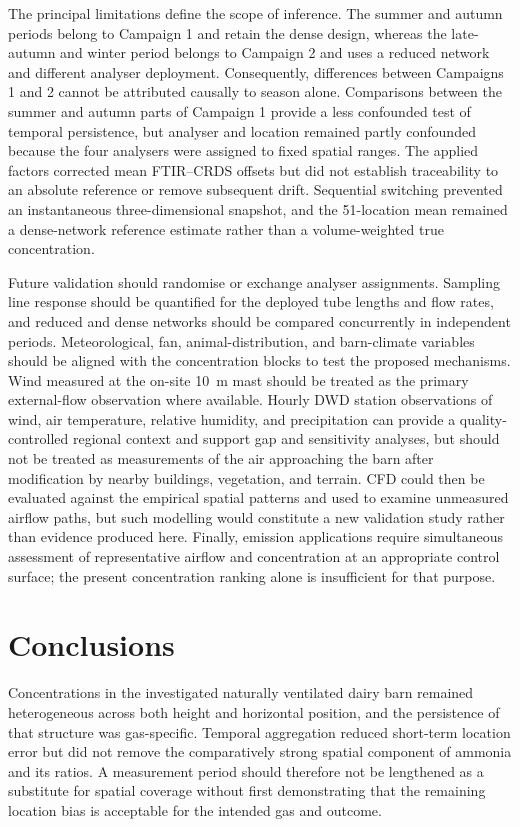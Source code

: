\documentclass[12pt,a4paper]{article}
\begin{document}
The principal limitations define the scope of inference. The summer and
autumn periods belong to Campaign 1 and retain the dense design, whereas the
late-autumn and winter period belongs to Campaign 2 and uses a reduced network
and different analyser deployment. Consequently, differences between
Campaigns 1 and 2 cannot be attributed causally to season alone. Comparisons
between the summer and autumn parts of Campaign 1 provide a less confounded
test of temporal persistence, but analyser and location remained partly
confounded because the four analysers were assigned to fixed spatial ranges.
The applied factors corrected mean FTIR--CRDS offsets but did not establish
traceability to an absolute reference or remove subsequent drift. Sequential
switching prevented an instantaneous three-dimensional snapshot, and the
51-location mean remained a dense-network reference estimate rather than a
volume-weighted true concentration.

Future validation should randomise or exchange analyser assignments. Sampling
line response should be quantified for the deployed tube lengths and flow
rates, and reduced and dense networks should be compared concurrently in
independent periods.
Meteorological, fan, animal-distribution, and barn-climate variables should be
aligned with the concentration blocks to test the proposed mechanisms. Wind
measured at the on-site \SI{10}{m} mast should be treated as the primary
external-flow observation where available. Hourly DWD station observations of
wind, air temperature, relative humidity, and precipitation can provide a
quality-controlled regional context and support gap and sensitivity analyses,
but should not be treated as measurements of the air approaching the barn
after modification by nearby buildings, vegetation, and terrain.
CFD could then be evaluated against the empirical spatial patterns and used to
examine unmeasured airflow paths, but such modelling would constitute a new
validation study rather than evidence produced here. Finally, emission
applications require simultaneous assessment of representative airflow and
concentration at an appropriate control surface; the present concentration
ranking alone is insufficient for that purpose.

\section{Conclusions}

Concentrations in the investigated naturally ventilated dairy barn remained
heterogeneous across both height and horizontal position, and the persistence
of that structure was gas-specific. Temporal aggregation reduced short-term
location error but did not remove the comparatively strong spatial component
of ammonia and its ratios. A measurement period should therefore not be
lengthened as a substitute for spatial coverage without first demonstrating
that the remaining location bias is acceptable for the intended gas and
outcome.
\end{document}
